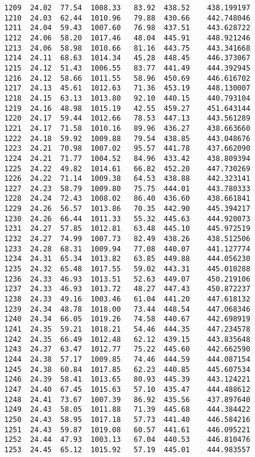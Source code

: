 \documentclass[11pt]{article}
\begin{document}
\begin{tcolorbox}[breakable, size=fbox, boxrule=.5pt, pad at break*=1mm, opacityfill=0]
\begin{Verbatim}[commandchars=\\\{\}]
1209  24.02  77.54  1008.33   83.92  438.52    438.199197
1210  24.03  62.44  1010.96   79.88  430.66    442.748046
1211  24.04  59.43  1007.60   76.98  437.51    443.628722
1212  24.06  58.20  1017.46   48.04  445.91    448.921246
1213  24.06  58.98  1010.66   81.16  443.75    443.341668
1214  24.11  68.63  1014.34   45.28  448.45    446.373067
1215  24.12  51.43  1006.55   83.77  441.49    444.392945
1216  24.12  58.66  1011.55   58.96  450.69    446.616702
1217  24.13  45.61  1012.63   71.36  453.19    448.130007
1218  24.15  63.13  1013.80   92.10  440.15    440.793104
1219  24.16  48.98  1015.19   42.55  459.27    451.643144
1220  24.17  59.44  1012.66   78.53  447.13    443.561289
1221  24.17  71.58  1010.16   89.96  436.27    438.663660
1222  24.18  59.92  1009.88   79.54  438.85    443.048676
1223  24.21  70.98  1007.02   95.57  441.78    437.662090
1224  24.21  71.77  1004.52   84.96  433.42    438.809394
1225  24.22  49.82  1014.61   66.82  452.20    447.730269
1226  24.22  71.14  1009.38   64.53  438.88    442.323141
1227  24.23  58.79  1009.80   75.75  444.01    443.780333
1228  24.24  72.43  1008.02   86.40  436.60    438.661841
1229  24.26  56.57  1013.86   70.35  442.90    445.394217
1230  24.26  66.44  1011.33   55.32  445.63    444.920073
1231  24.27  57.85  1012.81   63.48  445.10    445.972519
1232  24.27  74.99  1007.73   82.49  438.26    438.512506
1233  24.28  68.31  1009.94   77.08  440.07    441.127774
1234  24.31  65.34  1013.82   63.85  449.88    444.056230
1235  24.32  65.48  1017.55   59.02  443.31    445.010288
1236  24.33  46.93  1013.51   52.63  449.07    450.219106
1237  24.33  46.93  1013.72   48.27  447.43    450.872237
1238  24.33  49.16  1003.46   61.04  441.20    447.618132
1239  24.34  48.78  1018.00   73.44  448.54    447.068346
1240  24.34  66.05  1019.26   74.58  440.67    442.698919
1241  24.35  59.21  1018.21   54.46  444.35    447.234578
1242  24.35  66.49  1012.48   62.12  439.15    443.835648
1243  24.37  63.47  1012.77   75.22  445.60    442.662590
1244  24.38  57.17  1009.85   74.46  444.59    444.087154
1245  24.38  60.84  1017.85   62.23  440.85    445.607534
1246  24.39  58.41  1013.65   80.93  445.39    443.124221
1247  24.40  67.45  1015.63   57.10  435.47    444.488612
1248  24.41  73.67  1007.39   86.92  435.56    437.897640
1249  24.43  58.05  1011.88   71.39  445.68    444.384422
1250  24.43  58.95  1017.18   57.73  441.40    446.584216
1251  24.43  59.87  1019.08   60.57  441.61    446.095221
1252  24.44  47.93  1003.13   67.04  440.53    446.810476
1253  24.45  65.12  1015.92   57.19  445.01    444.983557

\end{Verbatim}
\end{tcolorbox}
\end{document}
